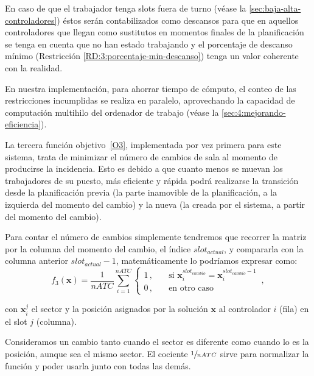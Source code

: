 En caso de que el trabajador tenga slots fuera de turno (véase la \autoref{sec:baja-alta-controladores}) éstos serán contabilizados como descansos para que en aquellos controladores que llegan como sustitutos en momentos finales de la planificación se tenga en cuenta que no han estado trabajando y el porcentaje de descanso mínimo (Restricción \ref{RD:3:porcentaje-min-descanso}) tenga un valor coherente con la realidad.

En nuestra implementación, para ahorrar tiempo de cómputo, el conteo de las restricciones incumplidas se realiza en paralelo, aprovechando la capacidad de computación multihilo del ordenador de trabajo (véase la \autoref{sec:4:mejorando-eficiencia}).

La tercera función objetivo~\ref{O3}, implementada por vez primera para este sistema, trata de minimizar el número de cambios de sala al momento de producirse la incidencia. Esto es debido a que cuanto menos se muevan los trabajadores de su puesto, más eficiente y rápida podrá realizarse la transición desde la planificación previa (la parte inamovible de la planificación, a la izquierda del momento del cambio) y la nueva (la creada por el sistema, a partir del momento del cambio).

Para contar el número de cambios simplemente tendremos que recorrer la matriz por la columna del momento del cambio, el índice $slot_{actual}$, y compararla con la columna anterior $slot_{actual}-1$, matemáticamente lo podríamos expresar como:
%
\[
    f_3(\textbf{x}) = \frac{1}{nATC} \sum_{i=1}^{nATC}
    \begin{cases}
        1\,, & \quad \textrm{si } \textbf{x}_i^{slot_{cambio}} = \textbf{x}_i^{slot_{cambio}-1} \\
        0\,, & \quad \textrm{en otro caso }
    \end{cases}
    \,,
\]



con $\textbf{x}_i^j$ el sector y la posición asignados por la solución $\textbf{x}$ al controlador $i$ (fila) en el slot $j$ (columna).

Consideramos un cambio tanto cuando el sector es diferente como cuando lo es la posición, aunque sea el mismo sector.
El cociente $\sfrac{1}{nATC}$ sirve para normalizar la función y poder usarla junto con todas las demás.

